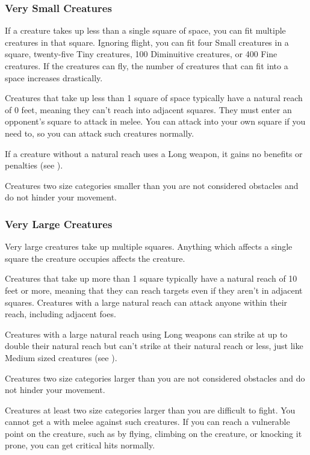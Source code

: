         \subsubsection{Very Small Creatures}
             If a creature takes up less than a single square of space, you can fit multiple creatures in that square.
            Ignoring flight, you can fit four Small creatures in a square, twenty-five Tiny creatures, 100 Diminuitive creatures, or 400 Fine creatures.
            If the creatures can fly, the number of creatures that can fit into a space increases drastically.

             Creatures that take up less than 1 square of space typically have a natural reach of 0 feet, meaning they can't reach into adjacent squares. They must enter an opponent's square to attack in melee. You can attack into your own square if you need to, so you can attack such creatures normally.

            If a creature without a natural reach uses a Long weapon, it gains no benefits or penalties (see ).

             Creatures two size categories smaller than you are not considered obstacles and do not hinder your movement.

        \subsubsection{Very Large Creatures}
             Very large creatures take up multiple squares. Anything which affects a single square the creature occupies affects the creature.

             Creatures that take up more than 1 square typically have a natural reach of 10 feet or more, meaning that they can reach targets even if they aren't in adjacent squares. Creatures with a large natural reach can attack anyone within their reach, including adjacent foes.

            Creatures with a large natural reach using Long weapons can strike at up to double their natural reach but can't strike at their natural reach or less, just like Medium sized creatures (see ).

             Creatures two size categories larger than you are not considered obstacles and do not hinder your movement.

             Creatures at least two size categories larger than you are difficult to fight.
            You cannot get a  with melee  against such creatures.
            If you can reach a vulnerable point on the creature, such as by flying, climbing on the creature, or knocking it prone, you can get critical hits normally.

